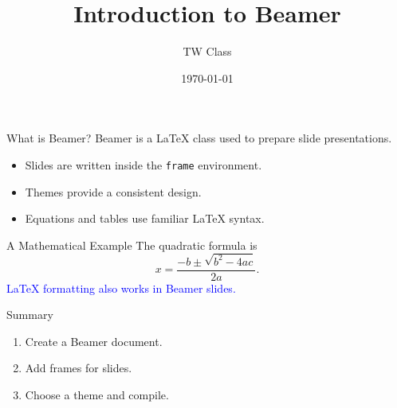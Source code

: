 \documentclass{beamer}
\title{Introduction to Beamer}
\author{TW Class}
\institute{Technical Writing}
\date{\today}
\begin{document}
\begin{frame}
  \titlepage
\end{frame}

\begin{frame}{What is Beamer?}
  Beamer is a LaTeX class used to prepare slide presentations.
  \begin{itemize}
    \item Slides are written inside the \texttt{frame} environment.
    \item Themes provide a consistent design.
    \item Equations and tables use familiar LaTeX syntax.
  \end{itemize}
\end{frame}

\begin{frame}{A Mathematical Example}
  The quadratic formula is
  \[
    x = \frac{-b \pm \sqrt{b^2-4ac}}{2a}.
  \]
  \textcolor{blue}{LaTeX formatting also works in Beamer slides.}
\end{frame}

\begin{frame}{Summary}
  \begin{enumerate}
    \item Create a Beamer document.
    \item Add frames for slides.
    \item Choose a theme and compile.
  \end{enumerate}
\end{frame}
\end{document}
